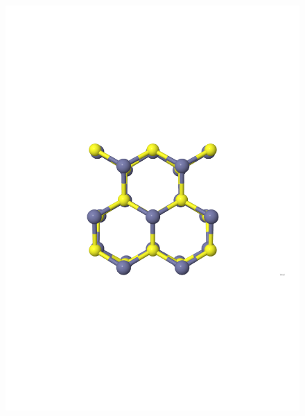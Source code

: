 \documentclass[11pt,oneside,czech,american]{book} %
\theoremstyle{plain}
\theoremstyle{definition}
\begin{document}
\begin{figure}[H]
	\includegraphics[scale=0.26]{wurtzite_nolabels.pdf}

\end{figure}
\end{document}
